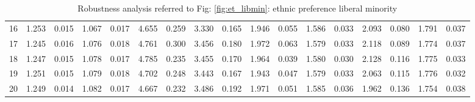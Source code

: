 \documentclass{article}
\begin{document}
\begin{table}[H]
{\begin{tabular}{|c|c|c|c|c|c|c|c|c|c|c|c|c|c|c|c|c|}
    16 & 1.253 & 0.015 & 1.067 & 0.017 & 4.655 & 0.259 & 3.330 & 0.165 & 1.946 & 0.055 & 1.586 & 0.033 & 2.093 & 0.080 & 1.791 & 0.037 \\ 
    17 & 1.245 & 0.016 & 1.076 & 0.018 & 4.761 & 0.300 & 3.456 & 0.180 & 1.972 & 0.063 & 1.579 & 0.033 & 2.118 & 0.089 & 1.774 & 0.037 \\ 
    18 & 1.247 & 0.015 & 1.078 & 0.017 & 4.785 & 0.235 & 3.455 & 0.170 & 1.964 & 0.039 & 1.580 & 0.030 & 2.128 & 0.116 & 1.775 & 0.033 \\ 
    19 & 1.251 & 0.015 & 1.079 & 0.018 & 4.702 & 0.248 & 3.443 & 0.167 & 1.943 & 0.047 & 1.579 & 0.033 & 2.063 & 0.115 & 1.776 & 0.032 \\ 
    20 & 1.249 & 0.014 & 1.082 & 0.017 & 4.667 & 0.232 & 3.486 & 0.192 & 1.971 & 0.051 & 1.585 & 0.036 & 1.962 & 0.136 & 1.754 & 0.038 \\ 
   \hline
\end{tabular}
}

\caption{Robustness analysis referred to Fig: \ref{fig:et_libmin}: ethnic preference liberal minority}
\label{tab:et_libmin}

\end{table}













\section*{} %


\printbibliography
\end{document}
